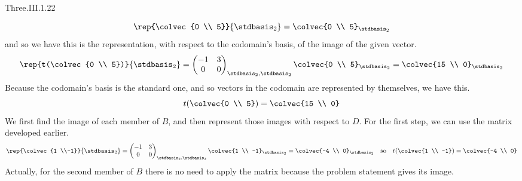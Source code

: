 \begin{ans}{Three.III.1.22}
\begin{exparts}
\begin{equation*}
            \rep{\colvec{0 \\ 5}}{\stdbasis_2}=\colvec{0 \\ 5}_{\stdbasis_2}
          \end{equation*}
          and so we have this is the representation, with respect to the
          codomain's basis, of the image of the given vector.
          \begin{equation*}
            \rep{t(\colvec{0 \\ 5})}{\stdbasis_2}
            =\begin{pmatrix}
              -1  &3   \\
               0  &0
             \end{pmatrix}_{\stdbasis_2,\stdbasis_2}
            \colvec{0 \\ 5}_{\stdbasis_2}
            =\colvec{15 \\ 0}_{\stdbasis_2}
          \end{equation*}
          Because the codomain's basis is the standard one, and so vectors
          in the codomain are represented by themselves, we have this.
          \begin{equation*}
            t(\colvec{0 \\ 5})
            =\colvec{15 \\ 0}
          \end{equation*}
        \partsitem We first find the image of each member of \( B \), and then
          represent those images with respect to \( D \).
          For the first step, we can use the matrix developed earlier.
          \begin{equation*}
            \rep{\colvec{1 \\-1}}{\stdbasis_2}
            =\begin{pmatrix}
              -1  &3   \\
               0  &0
             \end{pmatrix}_{\stdbasis_2,\stdbasis_2}
            \colvec{1 \\ -1}_{\stdbasis_2}
            =\colvec{-4 \\ 0}_{\stdbasis_2}
            \quad\text{so}\quad
            t(\colvec{1 \\ -1})=\colvec{-4 \\ 0}
          \end{equation*}
          Actually, for the second member of $B$ there is no need to apply the
          matrix because the problem statement gives its image.
          \begin{equation*}

\end{equation*}
\end{exparts}
\end{ans}
